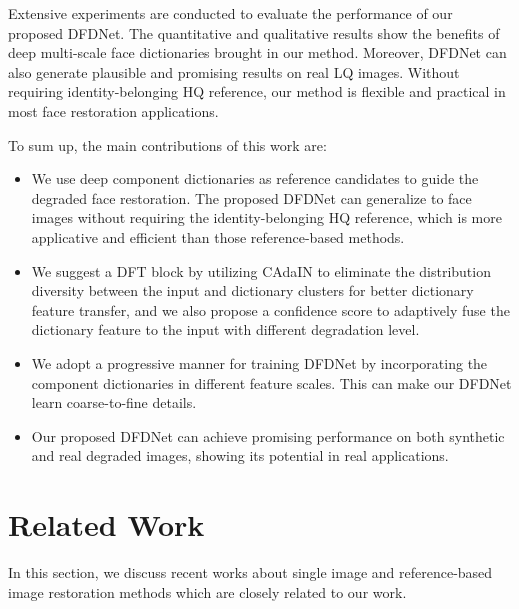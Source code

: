 \documentclass[runningheads]{llncs}
\begin{document}
Extensive experiments are conducted to evaluate the performance of our proposed DFDNet. The quantitative and qualitative results show the benefits of deep multi-scale face dictionaries brought in our method. Moreover, DFDNet can also generate plausible and promising results on real LQ images. Without requiring identity-belonging HQ reference, our method is flexible and practical in most face restoration applications. 


To sum up, the main contributions of this work are:
\begin{itemize}
\item We use deep component dictionaries as reference candidates to guide the degraded face restoration. The proposed DFDNet can generalize to face images without requiring the identity-belonging HQ reference, which is more applicative and efficient than those reference-based methods. 
\item We suggest a DFT block by utilizing CAdaIN to eliminate the distribution diversity between the input and dictionary clusters for better dictionary feature transfer, and we also propose a confidence score to adaptively fuse the dictionary feature to the input with different degradation level.
\item We adopt a progressive manner for training DFDNet by incorporating the component dictionaries in different feature scales. This can make our DFDNet learn coarse-to-fine details. 
\item Our proposed DFDNet can achieve promising performance on both synthetic and real degraded images, showing its potential in real applications.
\end{itemize}

\section{Related Work}\label{section2}
In this section, we discuss recent works about single image and reference-based image restoration methods which are closely related to our work.
\end{document}
